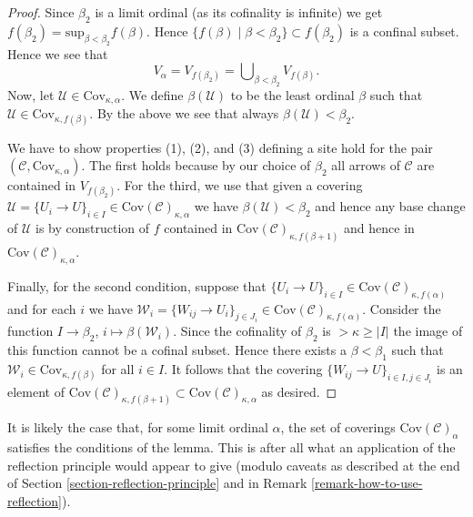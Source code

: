 \begin{proof}
\medskip\noindent
Since $\beta_2$ is a limit ordinal (as its cofinality is infinite)
we get $f(\beta_2) = \text{sup}_{\beta < \beta_2} f(\beta)$.
Hence $\{f(\beta) \mid \beta < \beta_2\} \subset f(\beta_2)$ is a
confinal subset. Hence we see that
$$
V_\alpha = V_{f(\beta_2)} = \bigcup\nolimits_{\beta < \beta_2} V_{f(\beta)}.
$$
Now, let $\mathcal{U} \in \text{Cov}_{\kappa, \alpha}$.
We define $\beta(\mathcal{U})$ to be the least ordinal $\beta$ such that
$\mathcal{U} \in \text{Cov}_{\kappa, f(\beta)}$. By the above we see
that always $\beta(\mathcal{U}) < \beta_2$.

\medskip\noindent
We have to show properties (1), (2), and (3) defining a site
hold for the pair $(\mathcal{C}, \text{Cov}_{\kappa, \alpha})$.
The first holds because by our choice of $\beta_2$
all arrows of $\mathcal{C}$ are contained in $V_{f(\beta_2)}$.
For the third, we use that given a covering
$\mathcal{U} = \{U_i \to U\}_{i \in I}
\in \text{Cov}(\mathcal{C})_{\kappa, \alpha}$
we have $\beta(\mathcal{U}) < \beta_2$ and hence
any base change of $\mathcal{U}$ is by construction of
$f$ contained in $\text{Cov}(\mathcal{C})_{\kappa, f(\beta + 1)}$
and hence in $\text{Cov}(\mathcal{C})_{\kappa, \alpha}$.

\medskip\noindent
Finally, for the second condition, suppose that $\{U_i \to U\}_{i\in I}
\in \text{Cov}(\mathcal{C})_{\kappa, f(\alpha)}$
and for each $i$ we have
$\mathcal{W}_i = \{W_{ij} \to U_i\}_{j\in J_i}
\in \text{Cov}(\mathcal{C})_{\kappa, f(\alpha)}$.
Consider the function
$I \to \beta_2$, $i \mapsto \beta(\mathcal{W}_i)$. Since the cofinality
of $\beta_2$ is $> \kappa \geq |I|$ the image of this function cannot be a
cofinal subset. Hence there exists a $\beta < \beta_1$ such
that $\mathcal{W}_i \in \text{Cov}_{\kappa, f(\beta)}$ for all $i \in I$.
It follows that the covering $\{W_{ij} \to U\}_{i\in I, j \in J_i}$
is an element of $\text{Cov}(\mathcal{C})_{\kappa, f(\beta + 1)}
\subset \text{Cov}(\mathcal{C})_{\kappa, \alpha}$ as desired.
\end{proof}

\begin{remark}
\label{remark-better}
It is likely the case that, for some limit ordinal $\alpha$,
the set of coverings $\text{Cov}(\mathcal{C})_\alpha$ satisfies
the conditions of the lemma. This is after all what an application
of the reflection principle would appear to give (modulo caveats as
described at the end of Section \ref{section-reflection-principle}
and in Remark \ref{remark-how-to-use-reflection}).
\end{remark}








